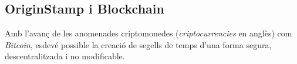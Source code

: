 \subsection{OriginStamp i Blockchain}
\label{arquitectura:blockchain}
Amb l'avanç de les anomenades criptomonedes (\textit{criptocurrencies} en anglès) com \textit{Bitcoin}, esdevé possible la creació de segells de temps d'una forma segura, descentralitzada i no modificable.\\
